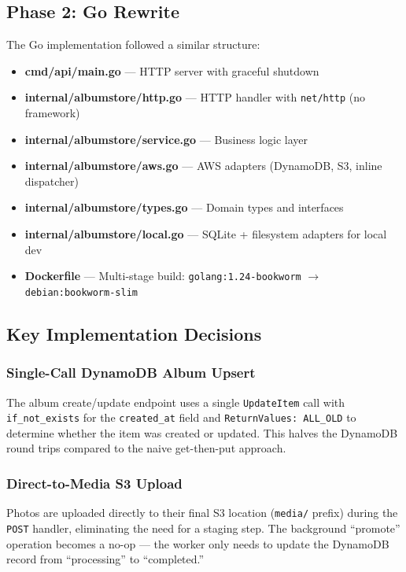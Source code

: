 \documentclass[11pt]{article}
\begin{document}
\subsection{Phase 2: Go Rewrite}

The Go implementation followed a similar structure:

\begin{itemize}
    \item \textbf{cmd/api/main.go} --- HTTP server with graceful shutdown
    \item \textbf{internal/albumstore/http.go} --- HTTP handler with \texttt{net/http} (no framework)
    \item \textbf{internal/albumstore/service.go} --- Business logic layer
    \item \textbf{internal/albumstore/aws.go} --- AWS adapters (DynamoDB, S3, inline dispatcher)
    \item \textbf{internal/albumstore/types.go} --- Domain types and interfaces
    \item \textbf{internal/albumstore/local.go} --- SQLite + filesystem adapters for local dev
    \item \textbf{Dockerfile} --- Multi-stage build: \texttt{golang:1.24-bookworm} $\rightarrow$ \texttt{debian:bookworm-slim}
\end{itemize}

\subsection{Key Implementation Decisions}

\subsubsection{Single-Call DynamoDB Album Upsert}

The album create/update endpoint uses a single \texttt{UpdateItem} call with \texttt{if\_not\_exists} for the \texttt{created\_at} field and \texttt{ReturnValues: ALL\_OLD} to determine whether the item was created or updated. This halves the DynamoDB round trips compared to the naive get-then-put approach.

\subsubsection{Direct-to-Media S3 Upload}

Photos are uploaded directly to their final S3 location (\texttt{media/} prefix) during the \texttt{POST} handler, eliminating the need for a staging step. The background ``promote'' operation becomes a no-op --- the worker only needs to update the DynamoDB record from ``processing'' to ``completed.''
\end{document}

